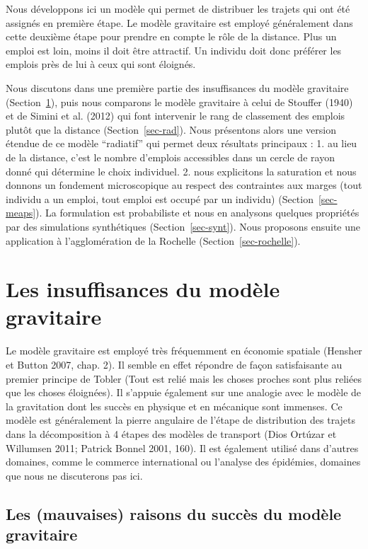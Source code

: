 \documentclass[
  10pt,
  a4paper,
  numbers=noendperiod,
  DIV=12]{scrartcl}
\begin{document}
Nous développons ici un modèle qui permet de distribuer les trajets qui
ont été assignés en première étape. Le modèle gravitaire est employé
généralement dans cette deuxième étape pour prendre en compte le rôle de
la distance. Plus un emploi est loin, moins il doit être attractif. Un
individu doit donc préférer les emplois près de lui à ceux qui sont
éloignés.

Nous discutons dans une première partie des insuffisances du modèle
gravitaire (Section~\ref{sec-grav}), puis nous comparons le modèle
gravitaire à celui de Stouffer (1940) et de Simini et al. (2012) qui
font intervenir le rang de classement des emplois plutôt que la distance
(Section~\ref{sec-rad}). Nous présentons alors une version étendue de ce
modèle ``radiatif'' qui permet deux résultats principaux : 1. au lieu de
la distance, c'est le nombre d'emplois accessibles dans un cercle de
rayon donné qui détermine le choix individuel. 2. nous explicitons la
saturation et nous donnons un fondement microscopique au respect des
contraintes aux marges (tout individu a un emploi, tout emploi est
occupé par un individu) (Section~\ref{sec-meaps}). La formulation est
probabiliste et nous en analysons quelques propriétés par des
simulations synthétiques (Section~\ref{sec-synt}). Nous proposons
ensuite une application à l'agglomération de la Rochelle
(Section~\ref{sec-rochelle}).

\hypertarget{sec-grav}{%
\section{Les insuffisances du modèle gravitaire}\label{sec-grav}}

Le modèle gravitaire est employé très fréquemment en économie spatiale
(Hensher et Button 2007, chap. 2). Il semble en effet répondre de façon
satisfaisante au premier principe de Tobler (Tout est relié mais les
choses proches sont plus reliées que les choses éloignées). Il s'appuie
également sur une analogie avec le modèle de la gravitation dont les
succès en physique et en mécanique sont immenses. Ce modèle est
généralement la pierre angulaire de l'étape de distribution des trajets
dans la décomposition à 4 étapes des modèles de transport (Dios Ortúzar
et Willumsen 2011; Patrick Bonnel 2001, 160). Il est également utilisé
dans d'autres domaines, comme le commerce international ou l'analyse des
épidémies, domaines que nous ne discuterons pas ici.

\hypertarget{les-mauvaises-raisons-du-succuxe8s-du-moduxe8le-gravitaire}{%
\subsection{Les (mauvaises) raisons du succès du modèle
gravitaire}\label{les-mauvaises-raisons-du-succuxe8s-du-moduxe8le-gravitaire}}
\end{document}
